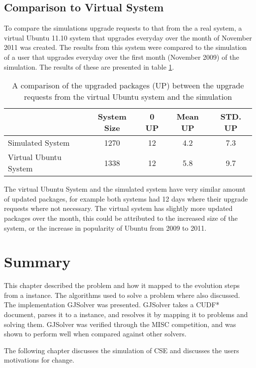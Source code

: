 \subsection{Comparison to Virtual System}
To compare the simulations upgrade requests to that from the a real system, a virtual Ubuntu 11.10 system that upgrades everyday over the month of November 2011 was created.
The results from this system were compared to the simulation of a user that upgrades everyday over the first month (November 2009) of the simulation.
The results of these are presented in table \ref{implementation.validvirtual}.
\begin{table}[htp]
\begin{center}
\begin{tabular}{| l | c |  c | c | c |}
\hline
&	System Size & 0 UP & Mean UP & STD. UP \\ \hline
Simulated System			& 1270 	& 12	 	& 4.2 		 	& 7.3 	\\
Virtual Ubuntu System 		& 1338 	& 12 		& 5.8 	 		& 9.7 	\\ \hline
\end{tabular}
\end{center}
\caption{A comparison of the upgraded packages (UP) between the upgrade requests from the virtual Ubuntu system and the simulation}
\label{implementation.validvirtual}
\end{table}

The virtual Ubuntu System and the simulated system have very similar amount of updated packages,
for example both systems had 12 days where their upgrade requests where not necessary.
The virtual system has slightly more updated packages over the month,
this could be attributed to the increased size of the system, or the increase in popularity of Ubuntu from 2009 to 2011. 

\section{Summary}
This chapter described the \modelimpl problem and how it mapped to the evolution steps from a \modelname instance.
The algorithms used to solve a \modelimpl problem where also discussed.
The implementation GJSolver was presented.
GJSolver takes a CUDF* document, parses it to a \modelname instance, and resolves it by mapping it to \modelimpl problems and solving them.
GJSolver was verified through the MISC competition, and was shown to perform well when compared against other solvers.

The following chapter discusses the simulation of CSE and discusses the users motivations for change.